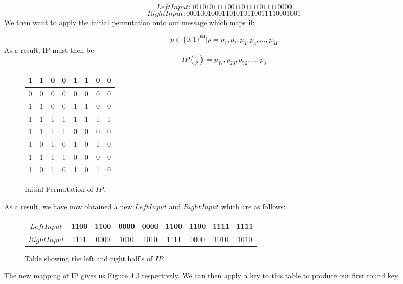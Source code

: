 \documentclass[11pt,a4paper, notitlepage]{report}
\begin{document}
\begin{displaymath}
Left Input: 1010 1011 1100 1101 1110 1111 0000
\end{displaymath}
\begin{displaymath}
Right Input: 0001 0010 0011 0101 0110 0111 1000 1001
\end{displaymath}
We then want to apply the initial permutation onto our message which maps if:

\begin{displaymath}
p \in \{0,1\}^{64} | p = p_{1}, p_{2}, p_{3}, p_{4},...,p_{64}
\end{displaymath}
As a result, IP must then be:
\begin{displaymath}
IP(_{p}) = p_{47}, p_{23}, p_{52},...,p_{3}
\end{displaymath}


\begin{figure}[H]
\centering
\label{tab:Iperm}
\begin{tabular}{ |c|c|c|c|c|c|c|c| }
\hline
1 & 1 & 0 & 0 & 1 & 1 & 0 & 0\\ \hline
0 & 0 & 0 & 0 & 0 & 0 & 0 & 0\\ \hline
1 & 1 & 0 & 0 & 1 & 1 & 0 & 0\\ \hline
1 & 1 & 1 & 1 & 1 & 1 & 1 & 1\\ \hline
1 & 1 & 1 & 1 & 0 & 0 & 0 & 0\\ \hline
1 & 0 & 1 & 0 & 1 & 0 & 1 & 0\\ \hline
1 & 1 & 1 & 1 & 0 & 0 & 0 & 0\\ \hline
1 & 0 & 1 & 0 & 1 & 0 & 1 & 0\\ \hline
\end{tabular}
\caption{Initial Permutation of $IP$.}
\end{figure}
As a result, we have now obtained a new $LeftInput$ and $RightInput$ which are as follows:

\begin{figure}[H]
\centering
\label{tab:LeftRight}
\begin{tabular}{|c|c|c|c|c|c|c|c|c|}
\hline
$LeftInput$ & 1100 & 1100 & 0000 & 0000 & 1100 & 1100 & 1111 & 1111\\ \hline
$RightInput$ & 1111 & 0000 & 1010 & 1010 & 1111 & 0000 & 1010 & 1010\\ \hline
\end{tabular}
\caption{Table showing the left and right half's of $IP$.}
\end{figure}

The new mapping of IP gives us Figure 4.3 respectively. We can then apply a key to this table to produce our first round key.
\end{document}
